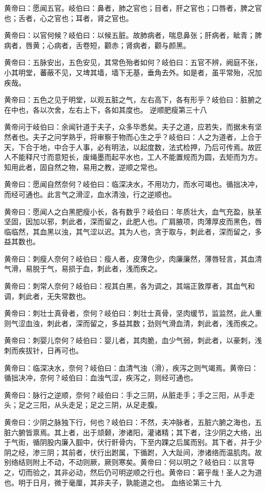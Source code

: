 \documentclass[a4paper,12pt,UTF8,twoside]{ctexbook}
\begin{document}
	黄帝曰：愿闻五官。岐伯曰：鼻者，肺之官也；目者，肝之官也；口唇者，脾之官也；舌者，心之官也；耳者，肾之官也。
	
	黄帝曰：以官何候？岐伯曰：以候五脏。故肺病者，喘息鼻张；肝病者，眦青；脾病者，唇黄；心病者，舌卷短，颧赤；肾病者，颧与颜黑。
	
	黄帝曰：五脉安出，五色安见，其常色殆者如何？岐伯曰：五官不辨，阙庭不张，小其明堂，蕃蔽不见，又埤其墙，墙下无基，垂角去外。如是者，虽平常殆，况加疾哉。
	
	黄帝曰：五色之见于明堂，以观五脏之气，左右高下，各有形乎？岐伯曰：脏腑之在中也，各以次舍，左右上下，各如其度也。
	逆顺肥瘦第三十八
	
	黄帝问于岐伯曰：余闻针道于夫子，众多毕悉矣。夫子之道，应若失，而据未有坚然者也。夫子之问学熟乎，将审察于物而心生之乎？岐伯曰：人之为道者，上合于天，下合于地，中合于人事，必有明法，以起度数，法式检押，乃后可传焉。故匠人不能释尺寸而意短长，废绳墨而起平水也，工人不能置规而为圆，去矩而为方。知用此者，固自然之物，易用之教，逆顺之常也。
	
	黄帝曰：愿闻自然奈何？岐伯曰：临深决水，不用功力，而水可竭也。循拙决冲，而经可通也。此言气之滑涩，血水清浊，行之逆顺也。
	
	黄帝曰：愿闻人之白黑肥瘦小长，各有数乎？岐伯曰：年质壮大，血气充盈，肤革坚固，因加以邪，刺此者，深而留之，此肥人也。广肩腋项，肉薄厚皮而黑色，唇临临然，其血黑以浊，其气涩以迟。其为人也，贪于取与，刺此者，深而留之，多益其数也。
	
	黄帝曰：刺瘦人奈何？岐伯曰：瘦人者，皮薄色少，肉廉廉然，薄唇轻言，其血清气滑，易脱于气，易损于血，刺此者，浅而疾之。
	
	黄帝曰：刺常人奈何？岐伯曰：视其白黑，各为调之，其端正敦厚者，其血气和调，刺此者，无失常数也。
	
	黄帝曰：刺壮士真骨者，奈何？岐伯曰：刺壮士真骨，坚肉缓节，监监然，此人重则气涩血浊，刺此者，深而留之，多益其数；劲则气滑血清，刺此者，浅而疾之。
	
	黄帝曰：刺婴儿奈何？岐伯曰：婴儿者，其肉脆，血少气弱，刺此者，以豪刺，浅刺而疾拔针，日再可也。
	
	黄帝曰：临深决水，奈何？岐伯曰：血清气浊（滑），疾泻之则气竭焉。黄帝曰：循拙决冲，奈何？岐伯曰：血浊气涩，疾泻之，则经可通也。
	
	黄帝曰：脉行之逆顺，奈何？岐伯曰：手之三阴，从脏走手；手之三阳，从手走头；足之三阳，从头走足；足之三阴，从足走腹。
	
	黄帝曰：少阴之脉独下行，何也？岐伯曰：不然，夫冲脉者，五脏六腑之海也，五脏六腑皆禀焉。其上者，出于颃颡，渗诸阳，灌诸精；其下者，注少阴之大络，出于气街，循阴股内廉入腘中，伏行骭骨内，下至内踝之后属而别。其下者，并于少阴之经，渗三阴；其前者，伏行出跗属，下循跗，入大趾间，渗诸络而温肌肉。故别络结则附上不动，不动则厥，厥则寒矣。黄帝曰：何以明之？岐伯曰：以言导之，切而验之，其非必动，然后仍可明逆顺之行也。黄帝曰：窘乎哉！圣人之为道也。明于日月，微于毫厘，其非夫子，孰能道之也。
	血络论第三十九
	
\end{document}
